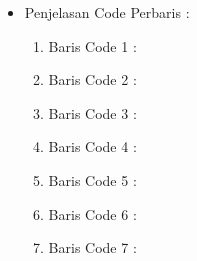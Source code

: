 \begin{enumerate}
\begin{itemize}
\par
\par
\item Penjelasan Code Perbaris	: 
\begin{enumerate}
\item Baris Code 1	:
\item Baris Code 2	:
\item Baris Code 3	:
\item Baris Code 4	:
\item Baris Code 5	:
\item Baris Code 6	:
\item Baris Code 7	:
\end{enumerate}
\par
\end{itemize}
\par
\par
\par
\end{enumerate}


